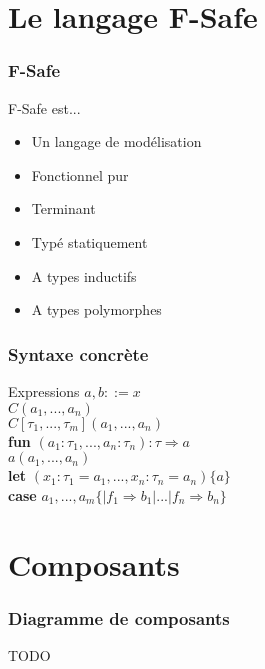 \section{Le langage F-Safe}

\begin{frame}
  \frametitle{F-Safe}
  \begin{block}{F-Safe est...}
    \begin{itemize}
      \item Un langage de modélisation
      \item Fonctionnel pur
      \item Terminant
      \item Typé statiquement
      \item A types inductifs
      \item A types polymorphes
    \end{itemize}
  \end{block}
\end{frame}

\begin{frame}
  \frametitle{Syntaxe concrète}
  \begin{block}{Expressions}
    $a, b ::= x$ \\
    \hspace{1,2cm}$C(a_1, ..., a_n)$ \\
    \hspace{1,2cm}$C[\tau_1, ..., \tau_m](a_1, ..., a_n)$ \\
    \hspace{1,2cm}\textbf{fun} $(a_1:\tau_1, ..., a_n:\tau_n) : \tau \Rightarrow a$ \\
    \hspace{1,2cm}$a(a_1, ..., a_n)$ \\
    \hspace{1,2cm}\textbf{let} $(x_1:\tau_1 = a_1, ..., x_n:\tau_n = a_n) \{ a \}$ \\
    \hspace{1,2cm}\textbf{case} $a_1, ..., a_m \{ | f_1 \Rightarrow b_1 | ... | f_n \Rightarrow b_n \}$
  \end{block}
\end{frame}

\section{Composants}

\begin{frame}
  \frametitle{Diagramme de composants}
  TODO
\end{frame}

